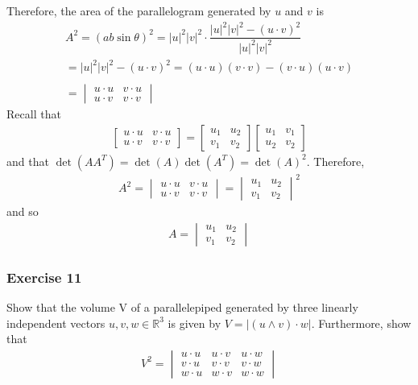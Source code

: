 \documentclass{article}
\newcommand{\R}{\mathbb{R}}
\begin{document}
	Therefore, the area of the parallelogram generated by $u$ and $v$ is
	\begin{gather*}
		A^2 = (ab \sin \theta)^2 = |u|^2|v|^2 \cdot \dfrac{|u|^2|v|^2 - (u \cdot v)^2}{|u|^2|v|^2} \\
		= |u|^2|v|^2 - (u \cdot v)^2 = (u \cdot u) (v \cdot v) - (v \cdot u) (u \cdot v) \\ \\
		=
		\begin{vmatrix}
			u \cdot u & v \cdot u \\
			u \cdot v & v \cdot v
		\end{vmatrix}
	\end{gather*}
	Recall that
	\begin{gather*}
		\begin{bmatrix}
			u \cdot u & v \cdot u \\
			u \cdot v & v \cdot v
		\end{bmatrix}
		=
		\begin{bmatrix} u_1 & u_2 \\ v_1 & v_2 \end{bmatrix}
		\begin{bmatrix} u_1 & v_1 \\ u_2 & v_2 \end{bmatrix}
	\end{gather*}
	and that $\det(AA^T) = \det(A)\det(A^T) = \det(A)^2$. Therefore, 
	\begin{gather*}
		A^2 = 
		\begin{vmatrix}
			u \cdot u & v \cdot u \\
			u \cdot v & v \cdot v
		\end{vmatrix}
		=
		\begin{vmatrix} u_1 & u_2 \\ v_1 & v_2 \end{vmatrix}^2
	\end{gather*}
	and so
	\begin{gather*}
		A = \begin{vmatrix} u_1 & u_2 \\ v_1 & v_2 \end{vmatrix}
	\end{gather*}
	
	\subsubsection*{Exercise 11}
	Show that the volume V of a parallelepiped generated by three linearly independent vectors $u, v, w \in \R^3$ is given by $V = |(u \wedge v) \cdot w|$. Furthermore, show that
	\begin{gather*}
		V^2 = 
		\begin{vmatrix}
			u \cdot u & u \cdot v & u \cdot w \\
			v \cdot u & v \cdot v & v \cdot w \\
			w \cdot u & w \cdot v & w \cdot w
		\end{vmatrix}
	\end{gather*}
	
\end{document}
